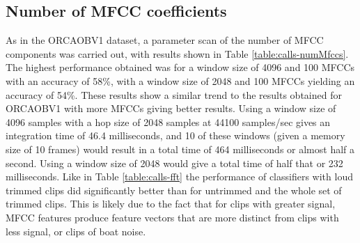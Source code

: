 %
%
\subsection{Number of MFCC coefficients}

As in the ORCAOBV1 dataset, a parameter scan of the number of MFCC
components was carried out, with results shown in Table
\ref{table:calls-numMfccs}.  The highest performance obtained was for
a window size of 4096 and 100 MFCCs with an accuracy of 58\%, with a
window size of 2048 and 100 MFCCs yielding an accuracy of 54\%.  These
results show a similar trend to the results obtained for ORCAOBV1 with
more MFCCs giving better results.  Using a window size of 4096 samples
with a hop size of 2048 samples at 44100 samples/sec gives an
integration time of 46.4 milliseconds, and 10 of these windows (given
a memory size of 10 frames) would result in a total time of 464
milliseconds or almost half a second.  Using a window size of 2048
would give a total time of half that or 232 milliseconds.  Like in
Table \ref{table:calls-fft} the performance of classifiers with loud
trimmed clips did significantly better than for untrimmed and the
whole set of trimmed clips.  This is likely due to the fact that for
clips with greater signal, MFCC features produce feature vectors that
are more distinct from clips with less signal, or clips of boat noise.

